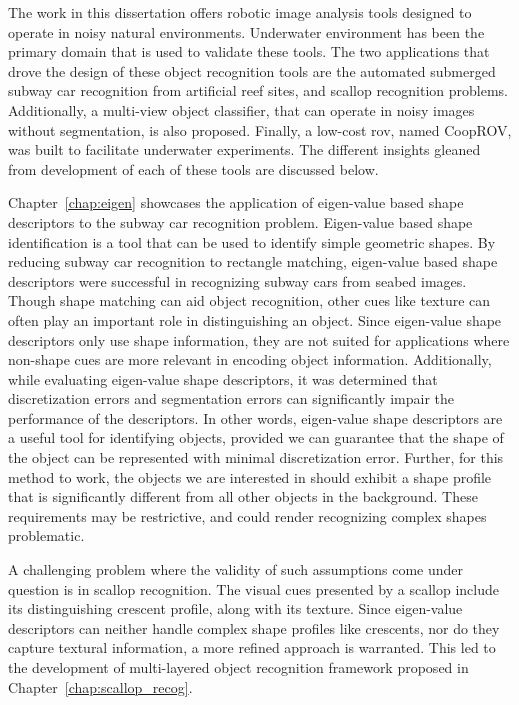 \documentclass {udthesis}
\begin{document}

The work in this dissertation offers robotic image analysis tools designed to operate in noisy natural environments. 
Underwater environment has been the primary domain that is used to validate these tools.
The two applications that drove the design of these object recognition tools are the automated submerged subway car recognition
from artificial reef sites, and scallop recognition problems.
Additionally, a multi-view object classifier, that can operate in noisy images without segmentation, is also proposed.
Finally, a low-cost \gls{rov}, named CoopROV, was built to facilitate underwater experiments. The different insights gleaned from development of each of these tools are discussed below.

Chapter~\ref{chap:eigen} showcases the application of eigen-value based shape descriptors to the subway car recognition problem. 
Eigen-value based shape identification is a tool that can be used to identify simple geometric shapes. 
By reducing subway car recognition to rectangle matching, eigen-value based shape descriptors were
successful in recognizing subway cars from seabed images.
Though shape matching can aid object recognition, other cues like texture can often play an important role
in distinguishing an object. Since eigen-value shape descriptors only use shape information, 
they are not suited for applications where non-shape cues are more relevant in encoding object information. 
Additionally, while evaluating eigen-value shape descriptors, it was determined that 
discretization errors and segmentation errors can significantly impair the performance of the descriptors.
In other words, eigen-value shape descriptors are a useful tool for identifying
objects, provided we can guarantee that the shape of the object can be represented with minimal discretization error. 
Further, for this method to work, the objects
we are interested in should exhibit a shape profile that is significantly different from
all other objects in the background. These requirements may be restrictive, and could render recognizing 
complex shapes problematic. 

A challenging problem where the validity of such assumptions come under question is in scallop recognition.
The visual cues presented by a scallop include its distinguishing crescent profile, along with its texture.
Since eigen-value descriptors can neither handle complex shape profiles like crescents, nor do they capture textural information,
a more refined approach is warranted.
This led to the development of multi-layered object recognition framework proposed in Chapter~\ref{chap:scallop_recog}.
\end{document}
